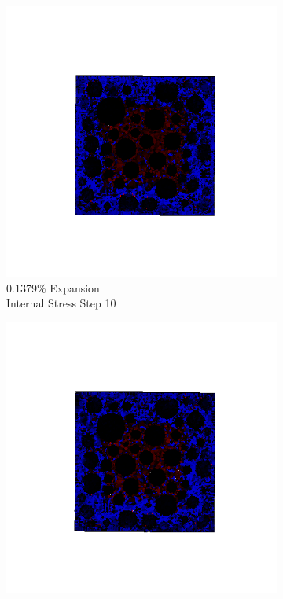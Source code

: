 \begin{figure}[h!]
\begin{subfigure}{.25\textwidth}
      \includegraphics[width=1.0\linewidth]{Files/exp_3D/DEF/A30X0C_1_s10.png}
      \caption{0.1379\% Expansion\\Internal Stress Step 10}
    \end{subfigure}%
    \begin{subfigure}{.25\textwidth}
      \centering
      \includegraphics[width=1.0\linewidth]{Files/exp_3D/DEF/A30X0C_1_s15.png}

\end{subfigure}
\end{figure}
